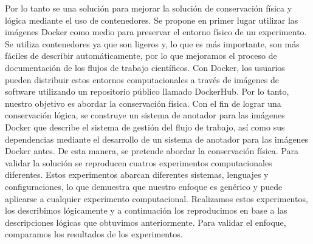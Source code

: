 Por lo tanto se una solución para mejorar la solución de conservación física y lógica mediante el uso de contenedores. 
Se propone en primer lugar utilizar las imágenes Docker como medio para preservar el entorno físico de un experimento. Se utiliza contenedores ya que son ligeros y, lo que es más importante, son más fáciles de describir automáticamente, por lo que mejoramos el proceso de documentación de los flujos de trabajo científicos.
Con Docker, los usuarios pueden distribuir estos entornos computacionales a través de imágenes de software utilizando un repositorio público llamado DockerHub. Por lo tanto, nuestro objetivo es abordar la conservación física.
Con el fin de lograr una conservación lógica, se construye un sistema de anotador para las imágenes Docker que describe el sistema de gestión del flujo de trabajo, así como sus dependencias mediante el desarrollo de un sistema de anotador para las imágenes Docker antes. De esta manera, se pretende abordar la conservación física.
Para validar la solución se reproducen cuatros experimentos computacionales diferentes. Estos experimentos abarcan diferentes sistemas, lenguajes y configuraciones, lo que demuestra que nuestro enfoque es genérico y puede aplicarse a cualquier experimento computacional. Realizamos estos experimentos, los describimos lógicamente y a continuación los reproducimos en base a las descripciones lógicas que obtuvimos anteriormente. Para validar el enfoque, comparamos los resultados de los experimentos.





